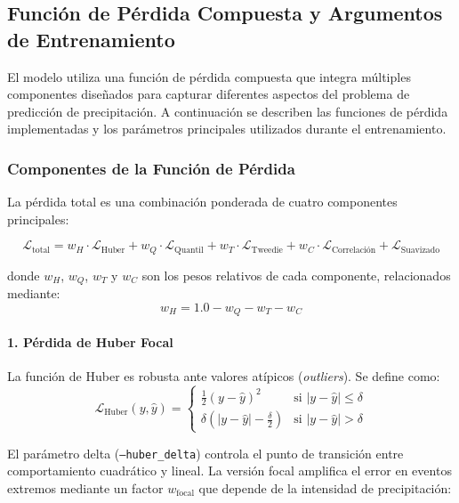 \subsection{Función de Pérdida Compuesta y Argumentos de Entrenamiento}

El modelo utiliza una función de pérdida compuesta que integra múltiples componentes diseñados para capturar diferentes aspectos del problema de predicción de precipitación. A continuación se describen las funciones de pérdida implementadas y los parámetros principales utilizados durante el entrenamiento.

\subsubsection{Componentes de la Función de Pérdida}

La pérdida total es una combinación ponderada de cuatro componentes principales:

\begin{equation}
\mathcal{L}_{\text{total}} = w_H \cdot \mathcal{L}_{\text{Huber}} + w_Q \cdot \mathcal{L}_{\text{Quantil}} + w_T \cdot \mathcal{L}_{\text{Tweedie}} + w_C \cdot \mathcal{L}_{\text{Correlación}} + \mathcal{L}_{\text{Suavizado}}
\end{equation}

donde $w_H$, $w_Q$, $w_T$ y $w_C$ son los pesos relativos de cada componente, relacionados mediante:
\begin{equation}
w_H = 1.0 - w_Q - w_T - w_C
\end{equation}

\paragraph{1. Pérdida de Huber Focal} 
La función de Huber es robusta ante valores atípicos (\textit{outliers}). Se define como:
\begin{equation}
\mathcal{L}_{\text{Huber}}(y, \hat{y}) = \begin{cases}
\frac{1}{2}(y - \hat{y})^2 & \text{si } |y - \hat{y}| \leq \delta \\
\delta \left(|y - \hat{y}| - \frac{\delta}{2}\right) & \text{si } |y - \hat{y}| > \delta
\end{cases}
\end{equation}

El parámetro delta (\texttt{--huber\_delta}) controla el punto de transición entre comportamiento cuadrático y lineal. La versión focal amplifica el error en eventos extremos mediante un factor $w_{\text{focal}}$ que depende de la intensidad de precipitación:

